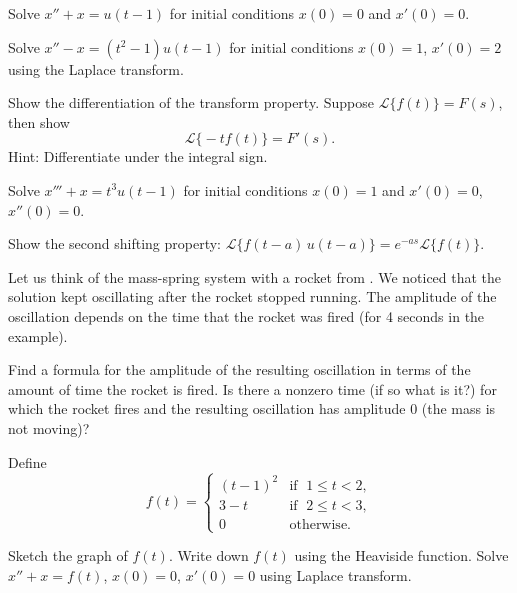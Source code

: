 \documentclass{ximera}
\begin{document}
\begin{exercise}
    Solve $x'' + x = u(t-1)$ for initial conditions $x(0) = 0$ and $x'(0) = 0$.
\end{exercise}

\begin{exercise}%
Solve $x''-x = (t^2-1) u(t-1)$ for initial conditions $x(0)=1$, $x'(0) = 2$ using the Laplace transform.
\end{exercise}
 

\begin{exercise}
    Show the differentiation of the transform property.  Suppose $\mathcal{L} \bigl\{ f(t) \bigr\} = F(s)$, then show
    \begin{equation*}
        \mathcal{L} \bigl\{ -t f(t) \bigr\} = F'(s) .
    \end{equation*}
    Hint: Differentiate under the integral sign.
\end{exercise}

\begin{exercise}
    Solve $x''' + x = t^3 u(t-1)$ for initial conditions $x(0) = 1$ and $x'(0) = 0$, $x''(0) = 0$.
\end{exercise}

\begin{exercise}
    Show the second shifting property: $\mathcal{L} \bigl\{ f(t-a) \, u(t-a) \bigr\} = e^{-as} \mathcal{L} \bigl\{ f(t) \bigr\}$.
\end{exercise}

\begin{exercise}
    Let us think of the mass-spring system with a rocket from .  We noticed that the solution kept oscillating after the rocket stopped running.  The amplitude of the oscillation depends on the time that the rocket was fired (for 4 seconds in the example). 
    \begin{tasks}
    \task Find a formula for the amplitude of the resulting oscillation in terms of the amount of time the rocket is fired.
    \task Is there a nonzero time (if so what is it?) for which the rocket fires and the resulting oscillation has amplitude 0 (the mass is not moving)?
    \end{tasks}
\end{exercise}

\begin{exercise}
    Define
    \begin{equation*}
        f(t) =
        \begin{cases}
            {(t-1)}^2 & \text{if } \; 1 \leq t < 2, \\
            3-t & \text{if } \; 2 \leq t < 3, \\
            0 & \text{otherwise} .
        \end{cases}
    \end{equation*}
    \begin{tasks}
        \task Sketch the graph of $f(t)$.
        \task Write down $f(t)$ using the Heaviside function.
        \task Solve $x''+x=f(t)$, $x(0)=0$, $x'(0) = 0$ using Laplace transform.
    \end{tasks}
\end{exercise}
\end{document}
